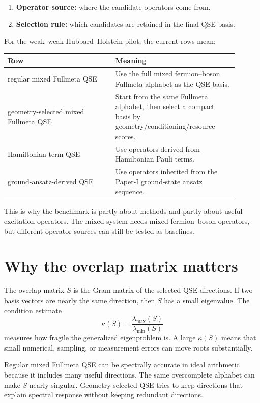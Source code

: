 \documentclass[10pt,twocolumn]{article}
\begin{document}
\begin{enumerate}
\item \textbf{Operator source:} where the candidate operators come from.
\item \textbf{Selection rule:} which candidates are retained in the final QSE basis.
\end{enumerate}
For the weak--weak Hubbard--Holstein pilot, the current rows mean:
\begin{center}
\begin{tabular}{p{0.42\linewidth}p{0.48\linewidth}}
\toprule
Row & Meaning\\
\midrule
regular mixed Fullmeta QSE & Use the full mixed fermion--boson Fullmeta alphabet as the QSE basis.\\
geometry-selected mixed Fullmeta QSE & Start from the same Fullmeta alphabet, then select a compact basis by geometry/conditioning/resource scores.\\
Hamiltonian-term QSE & Use operators derived from Hamiltonian Pauli terms.\\
ground-ansatz-derived QSE & Use operators inherited from the Paper-I ground-state ansatz sequence.\\
\bottomrule
\end{tabular}
\end{center}
This is why the benchmark is partly about methods and partly about useful excitation operators.  The mixed system needs mixed fermion--boson operators, but different operator sources can still be tested as baselines.

\section{Why the overlap matrix matters}
The overlap matrix \(S\) is the Gram matrix of the selected QSE directions.  If two basis vectors are nearly the same direction, then \(S\) has a small eigenvalue.  The condition estimate
\begin{equation}
  \kappa(S)=\frac{\lambda_{\max}(S)}{\lambda_{\min}(S)}
\end{equation}
measures how fragile the generalized eigenproblem is.  A large \(\kappa(S)\) means that small numerical, sampling, or measurement errors can move roots substantially.

Regular mixed Fullmeta QSE can be spectrally accurate in ideal arithmetic because it includes many useful directions.  The same overcomplete alphabet can make \(S\) nearly singular.  Geometry-selected QSE tries to keep directions that explain spectral response without keeping redundant directions.
\end{document}
